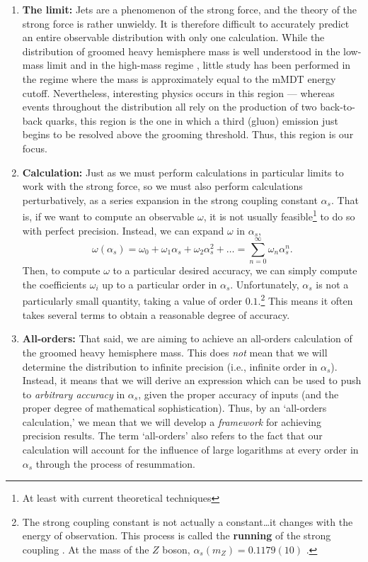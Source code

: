 \documentclass[../thesis.tex]{subfiles}
\begin{document}
\begin{enumerate}
		\item \textbf{The limit:} Jets are a phenomenon of the strong force, and the theory of the strong force is rather unwieldy. It is therefore difficult to accurately predict an entire observable distribution with only one calculation. While the distribution of groomed heavy hemisphere mass is well understood in the low-mass limit \cite{kardos_groomed_2020,kardos_two-_2020,frye_factorization_2016} and in the high-mass regime \cite{kardos_soft-drop_2018}, little study has been performed in the regime where the mass is approximately equal to the mMDT energy cutoff. Nevertheless, interesting physics occurs in this region --- whereas events throughout the distribution all rely on the production of two back-to-back quarks, this region is the one in which a third (gluon) emission just begins to be resolved above the grooming threshold. Thus, this region is our focus.

		\item \textbf{Calculation:} Just as we must perform calculations in particular limits to work with the strong force, so we must also perform calculations perturbatively, as a series expansion in the strong coupling constant $\alpha_s$. That is, if we want to compute an observable $\omega$, it is not usually feasible\footnote{At least with current theoretical techniques} to do so with perfect precision. Instead, we can expand $\omega$ in $\alpha_s$,
		\begin{equation}
			\omega(\alpha_s) = \omega_0 + \omega_1 \alpha_s + \omega_2 \alpha_s^2 + \dots = \sum_{n = 0}^\infty \omega_n \alpha_s^n.
		\end{equation}
		Then, to compute $\omega$ to a particular desired accuracy, we can simply compute the coefficients $\omega_i$ up to a particular order in $\alpha_s$. Unfortunately, $\alpha_s$ is not a particularly small quantity, taking a value of order $0.1$.\footnote{The strong coupling constant is not actually a constant\dots it changes with the energy of observation. This process is called the \textbf{running} of the strong coupling \cite{larkoski_elementary_2019-1}. At the mass of the $Z$ boson, $\alpha_s(m_Z) = 0.1179(10)$ \cite{particle_data_group_review_2020}.} This means it often takes several terms to obtain a reasonable degree of accuracy.

		\item \textbf{All-orders:} That said, we are aiming to achieve an all-orders calculation of the groomed heavy hemisphere mass. This does \textit{not} mean that we will determine the distribution to infinite precision (i.e., infinite order in $\alpha_s$). Instead, it means that we will derive an expression which can be used to push to \textit{arbitrary accuracy} in $\alpha_s$, given the proper accuracy of inputs (and the proper degree of mathematical sophistication). Thus, by an `all-orders calculation,' we mean that we will develop a \textit{framework} for achieving precision results. The term `all-orders' also refers to the fact that our calculation will account for the influence of large logarithms at every order in $\alpha_s$ through the process of resummation.
	\end{enumerate}
\end{document}
